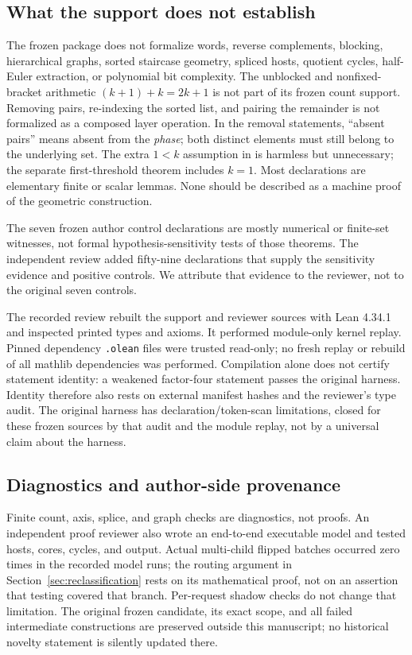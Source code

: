 \subsection{What the support does not establish}\label{app:formal-limits}
The frozen package does not formalize words, reverse complements,
blocking, hierarchical graphs, sorted staircase geometry, spliced hosts,
quotient cycles, half-Euler extraction, or polynomial bit complexity.
The unblocked and nonfixed-bracket arithmetic $(k+1)+k=2k+1$ is not
part of its frozen count support. Removing pairs, re-indexing the sorted
list, and pairing the remainder is not formalized as a composed layer
operation. In the removal statements, ``absent pairs'' means absent
from the \emph{phase}; both distinct elements must still belong to the
underlying set. The extra $1<k$ assumption in
 is harmless but unnecessary;
the separate first-threshold theorem includes $k=1$.
Most declarations are elementary finite or scalar lemmas. None should
be described as a machine proof of the geometric construction.

The seven frozen author control declarations are mostly numerical or
finite-set witnesses, not formal hypothesis-sensitivity tests of those
theorems. The independent review added fifty-nine declarations that
supply the sensitivity evidence and positive controls. We attribute
that evidence to the reviewer, not to the original seven controls.

The recorded review rebuilt the support and reviewer sources with Lean
4.34.1 and inspected printed types and axioms. It performed module-only
kernel replay. Pinned dependency \texttt{.olean} files were trusted
read-only; no fresh replay or rebuild of all mathlib dependencies was
performed. Compilation alone does not certify statement identity:
a weakened factor-four statement passes the original harness.
Identity therefore also rests on external manifest hashes and the
reviewer's type audit. The original harness has declaration/token-scan
limitations, closed for these frozen sources by that audit and the
module replay, not by a universal claim about the harness.

\subsection{Diagnostics and author-side provenance}\label{app:diagnostics}
Finite count, axis, splice, and graph checks are diagnostics, not proofs.
An independent proof reviewer also wrote an end-to-end executable model
and tested hosts, cores, cycles, and output. Actual multi-child flipped
batches occurred zero times in the recorded model runs; the routing
argument in Section~\ref{sec:reclassification} rests on its mathematical proof,
not on an assertion that testing covered that branch. Per-request
shadow checks do not change that limitation. The original frozen
candidate, its exact scope, and all failed intermediate constructions
are preserved outside this manuscript; no historical novelty statement
is silently updated there.

